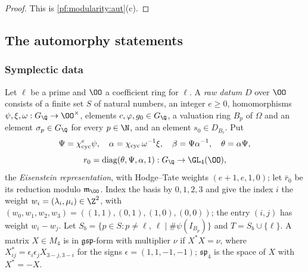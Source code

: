 \begin{proof}
This is \cref{pf:modularity:aut}(c).
\end{proof}

\subsection{The automorphy statements}\label{sec:pf:modularity:stmts}

\subsubsection{Symplectic data}

\begin{definition}\label{pf:modularity:raw}
Let $\ell$ be a prime and $\OO$ a coefficient ring for $\ell$. A \emph{raw datum} $D$ over $\OO$ consists of a finite
set $S$ of natural numbers, an integer $e\ge0$, homomorphisms $\psi,\xi,\omega:G_\Q\to\OO^\times$, elements
$c,\varphi,g_0\in G_\Q$, a valuation ring $B_p$ of $\Omega$ and an element $\sigma_p\in G_\Q$ for every $p\in\N$, and an
element $s_0\in D_{B_\ell}$. Put
\[
 \Psi=\chi_{\mathrm{cyc}}^e\psi,\quad \alpha=\chi_{\mathrm{cyc}}\,\omega^{-1}\xi,\quad \beta=\Psi\alpha^{-1},\quad
 \theta=\alpha\Psi,
\]
\[
 r_0=\operatorname{diag}(\theta,\Psi,\alpha,1):G_\Q\to\GL_4(\OO),
\]
the \emph{Eisenstein representation}, with Hodge--Tate weights $(e+1,e,1,0)$; let $\bar r_0$ be its reduction modulo
$\mathfrak m_\OO$. Index the basis by $0,1,2,3$ and give the index $i$ the weight $w_i=(\lambda_i,\mu_i)\in\Z^2$, with
$(w_0,w_1,w_2,w_3)=((1,1),(0,1),(1,0),(0,0))$; the entry $(i,j)$ has weight $w_i-w_j$. Let
$S_b=\{p\in S:p\ne\ell,\ \ell\mid\#\psi(I_{B_p})\}$ and $T=S_b\cup\{\ell\}$. A matrix $X\in M_4$ is in
$\mathfrak{gsp}$-form with multiplier $\nu$ if $X^\ast X=\nu$, where $X^\ast_{ij}=\epsilon_i\epsilon_jX_{3-j,3-i}$ for
the signs $\epsilon=(1,1,-1,-1)$; $\mathfrak{sp}_4$ is the space of $X$ with $X^\ast=-X$.


\end{definition}
